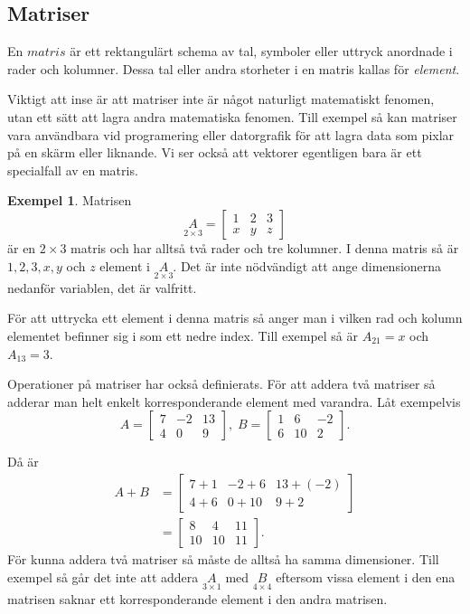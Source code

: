 \documentclass{article}
\theoremstyle{definition}
\newtheorem{exmp}[thm]{Exempel}
\begin{document}
\subsection{Matriser}
\begin{mydef}{}{}
  En $matris$ är ett rektangulärt schema av tal, symboler eller uttryck anordnade i rader och kolumner. 
  Dessa tal eller andra storheter i en matris kallas för \textit{element}.  
\end{mydef}
Viktigt att inse är att 
matriser inte är något naturligt matematiskt fenomen, 
utan ett sätt att lagra andra matematiska fenomen.
Till exempel så kan matriser vara användbara vid programering eller datorgrafik för att lagra data som 
pixlar på en skärm eller liknande. Vi ser också att vektorer egentligen bara är ett specialfall av en 
matris.
\begin{exmp}
Matrisen
\[ \underset{2 \times 3}{A} = 
  \begin{bmatrix}
    1 & 2 & 3 \\
    x & y & z
  \end{bmatrix}
\]
är en $2 \times 3$ matris och har alltså två rader och tre kolumner.
I denna matris så är $1, 2, 3, x, y$ och $z$ element i $\underset{2 \times 3}{A}.$
Det är inte nödvändigt att ange dimensionerna nedanför variablen, det är valfritt. 

För att uttrycka ett element i denna matris så anger man i vilken rad och kolumn 
elementet befinner sig i som ett nedre index. Till exempel så är 
$A_{21} = x$ och $A_{13} = 3$.
\end{exmp}

Operationer på matriser har också definierats. För att addera två matriser så adderar man helt enkelt korresponderande element med varandra. 
Låt exempelvis 
\[ A = 
  \begin{bmatrix}
    7 & -2 & 13 \\
    4 & 0 & 9
  \end{bmatrix}, \;
  B = 
  \begin{bmatrix}
    1 & 6 & -2 \\
    6 & 10 & 2
  \end{bmatrix}.
\]

Då är 
\begin{align*}
  A + B & =
  \begin{bmatrix}
    7 + 1 & -2 + 6 & 13 + (-2) \\
    4 + 6 & 0 + 10 & 9 + 2
  \end{bmatrix} \\
  & = 
  \begin{bmatrix}
    8 & 4 & 11 \\
    10 & 10 & 11
  \end{bmatrix}.
\end{align*}
För kunna addera två matriser så måste de alltså ha samma 
dimensioner. Till exempel så går det inte att 
addera $\underset{3 \times 1}{A}$ med $\underset{4 \times 4}{B}$ eftersom vissa element i den ena matrisen saknar ett korresponderande element i den andra matrisen.
\end{document}
